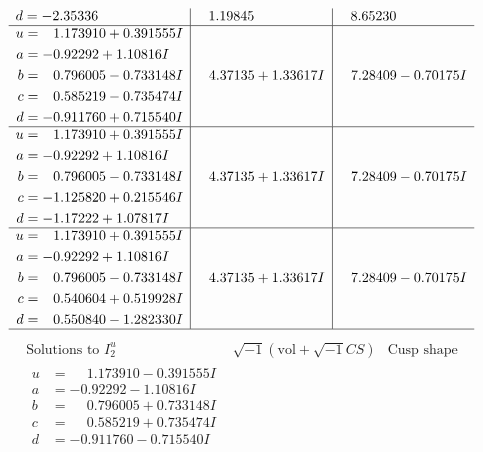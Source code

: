 \documentclass[1p]{elsarticle_modified}
\theoremstyle{definition}
\newcommand{\I}{\sqrt{-1}}
\begin{document}
$$\begin{array}{c|c|c}
\begin{aligned}
d &= -2.35336\phantom{ +0.000000I}\end{aligned}
 & \phantom{-}1.19845\phantom{ +0.000000I} & \phantom{-}8.65230\phantom{ +0.000000I} \\ \hline\begin{aligned}
u &= \phantom{-}1.173910 + 0.391555 I \\
a &= -0.92292 + 1.10816 I \\
b &= \phantom{-}0.796005 - 0.733148 I \\
c &= \phantom{-}0.585219 - 0.735474 I \\
d &= -0.911760 + 0.715540 I\end{aligned}
 & \phantom{-}4.37135 + 1.33617 I & \phantom{-}7.28409 - 0.70175 I \\ \hline\begin{aligned}
u &= \phantom{-}1.173910 + 0.391555 I \\
a &= -0.92292 + 1.10816 I \\
b &= \phantom{-}0.796005 - 0.733148 I \\
c &= -1.125820 + 0.215546 I \\
d &= -1.17222 + 1.07817 I\end{aligned}
 & \phantom{-}4.37135 + 1.33617 I & \phantom{-}7.28409 - 0.70175 I \\ \hline\begin{aligned}
u &= \phantom{-}1.173910 + 0.391555 I \\
a &= -0.92292 + 1.10816 I \\
b &= \phantom{-}0.796005 - 0.733148 I \\
c &= \phantom{-}0.540604 + 0.519928 I \\
d &= \phantom{-}0.550840 - 1.282330 I\end{aligned}
 & \phantom{-}4.37135 + 1.33617 I & \phantom{-}7.28409 - 0.70175 I\\
 \hline 
 \end{array}$$\newpage$$\begin{array}{c|c|c}  
\text{Solutions to }I^u_{2}& \I (\text{vol} + \sqrt{-1}CS) & \text{Cusp shape}\\
 \hline 
\begin{aligned}
u &= \phantom{-}1.173910 - 0.391555 I \\
a &= -0.92292 - 1.10816 I \\
b &= \phantom{-}0.796005 + 0.733148 I \\
c &= \phantom{-}0.585219 + 0.735474 I \\
d &= -0.911760 - 0.715540 I\end{aligned}

\end{array}$$
\end{document}
